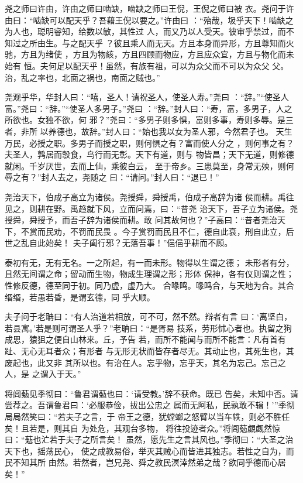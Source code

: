 \documentclass[a4paper,12pt,UTF8,twoside]{ctexbook}
\begin{document}
尧之师曰许由，许由之师曰啮缺，啮缺之师曰王倪，王倪之师曰被 衣。尧问于许由曰：“啮缺可以配天乎？吾藉王倪以要之。”许由曰 ：“殆哉，圾乎天下！啮缺之为人也，聪明睿知，给数以敏，其性过 人，而又乃以人受天。彼审乎禁过，而不知过之所由生。与之配天乎 ？彼且乘人而无天。方且本身而异形，方且尊知而火驰，方且为绪使 ，方且为物絯，方且四顾而物应，方且应众宜，方且与物化而未始有 恒。夫何足以配天乎！虽然，有族有祖，可以为众父而不可以为众父 父。治，乱之率也，北面之祸也，南面之贼也。”

尧观乎华，华封人曰：“嘻，圣人！请祝圣人，使圣人寿。”尧曰 ：“辞。”“使圣人富。”尧曰：“辞。”“使圣人多男子。”尧曰 ：“辞。”封人曰：“寿，富，多男子，人之所欲也。女独不欲，何 邪？”尧曰：“多男子则多惧，富则多事，寿则多辱。是三者，非所 以养德也，故辞。”封人曰：“始也我以女为圣人邪，今然君子也。 天生万民，必授之职。多男子而授之职，则何惧之有？富而使人分之 ，则何事之有？夫圣人，鹑居而彀食，鸟行而无彰。天下有道，则与 物皆昌；天下无道，则修德就闲。千岁厌世，去而上仙，乘彼白云， 至于帝乡。三患莫至，身常无殃，则何辱之有？”封人去之，尧随之 曰：“请问。”封人曰：“退已！”

尧治天下，伯成子高立为诸侯。尧授舜，舜授禹，伯成子高辞为诸 侯而耕。禹往见之，则耕在野。禹趋就下风，立而问焉，曰：“昔尧 治天下，吾子立为诸侯。尧授舜，舜授予，而吾子辞为诸侯而耕。敢 问其故何也？”子高曰：“昔者尧治天下，不赏而民劝，不罚而民畏 。今子赏罚而民且不仁，德自此衰，刑自此立，后世之乱自此始矣！ 夫子阖行邪？无落吾事！”俋俋乎耕而不顾。

泰初有无，无有无名。一之所起，有一而未形。物得以生谓之德； 未形者有分，且然无间谓之命；留动而生物，物成生理谓之形；形体 保神，各有仪则谓之性；性修反德，德至同于初。同乃虚，虚乃大。 合喙鸣。喙鸣合，与天地为合。其合缗缗，若愚若昏，是谓玄德，同 乎大顺。

夫子问于老聃曰：“有人治道若相放，可不可，然不然。辩者有言 曰：‘离坚白，若县寓。’若是则可谓圣人乎？”老聃曰：“是胥易 技系，劳形怵心者也。执留之狗成思，猿狙之便自山林来。丘，予告 若，而所不能闻与而所不能言：凡有首有趾、无心无耳者众；有形者 与无形无状而皆存者尽无。其动止也，其死生也，其废起也，此又非 其所以也。有治在人。忘乎物，忘乎天，其名为忘己。忘己之人，是 之谓入于天。”

将闾葂见季彻曰：“鲁君谓葂也曰：‘请受教。’辞不获命。既已 告矣，未知中否。请尝荐之。吾谓鲁君曰：‘必服恭俭，拔出公忠之 属而无阿私，民孰敢不辑！’”季彻局局然笑曰：“若夫子之言，于 帝王之德，犹螳螂之怒臂以当车轶，则必不胜任矣！且若是，则其自 为处危，其观台多物， 将往投迹者众。”将闾葂覷觑然惊曰：“葂也汒若于夫子之所言矣！ 虽然，愿先生之言其风也。”季彻曰：“大圣之治天下也，摇荡民心， 使之成教易俗，举灭其贼心而皆进其独志。若性之自为，而民不知其所 由然。若然者，岂兄尧、舜之教民溟涬然弟之哉？欲同乎德而心居矣！”
\end{document}
